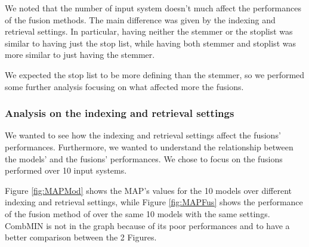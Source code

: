 {	We noted that the number of input system doesn't much affect the performances of the fusion methods. The main difference was given by the indexing and retrieval settings. In particular, having neither the stemmer or the stoplist was similar to having just the stop list, while having both stemmer and stoplist was more similar to just having the stemmer.
	
	We expected the stop list to be more defining than the stemmer, so we performed some further analysis focusing on what affected more the fusions.
	
	\subsubsection{Analysis on the indexing and retrieval settings}
	We wanted to see how the indexing and retrieval settings affect the fusions' performances. Furthermore, we wanted to understand the relationship between the models' and the fusions' performances.
	We chose to focus on the fusions performed over 10 input systems. 
	
	Figure \ref{fig:MAPMod} shows the MAP's values for the 10 models over different indexing and retrieval settings, while Figure \ref{fig:MAPFus} shows the performance of the fusion  method of over the same 10 models with the same settings. CombMIN is not in the graph because of its poor performances and to have a better comparison between the 2 Figures.
	
}
